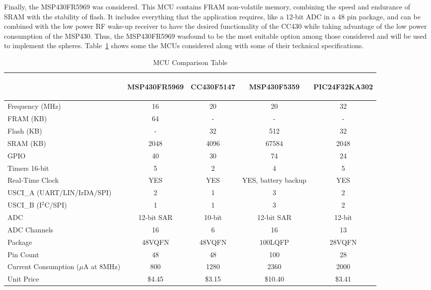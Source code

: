 Finally, the MSP430FR5969 was considered. This MCU contains FRAM non-volatile memory, combining the speed and endurance of SRAM with the stability of flash. It includes everything that the application requires, like a 12-bit ADC in a 48 pin package, and can be combined with the low power RF wake-up receiver to have the desired functionality of the CC430 while taking advantage of the low power consumption of the MSP430. Thus, the MSP430FR5969 wasfound to be the most suitable option among those considered and will be used to implement the spheres. Table~\ref{tab:mcuComp} shows some the MCUs considered along with some of their technical specifications.
\begin{table}[H]
\setlength{\extrarowheight}{1.5pt}
  \centering
  \caption{MCU Comparison Table}
    \begin{tabular}{|m{1.5in}|c|c|c|c|}
    \cline{2-5}
    \multicolumn{1}{c|}{} & \begin{sideways}MSP430FR5969 \end{sideways} &\begin{sideways} CC430F5147 \end{sideways}& \begin{sideways}MSP430F5359 \end{sideways}& \begin{sideways}PIC24F32KA302\end{sideways}\\ 
    \hline
    Frequency (MHz) & 16    & 20    & 20    & 32\\ \hline
    FRAM (KB) & 64    & -     & -     & -\\ \hline
    Flash (KB) & -     & 32    & 512   & 32\\ \hline
    SRAM (KB) & 2048  & 4096  & 67584 & 2048 \\ \hline
    GPIO  & 40    & 30    & 74    & 24    \\ \hline
    Timers 16-bit & 5     & 2     & 4     & 5     \\ \hline
    Real-Time Clock & YES   & YES   & YES, battery backup & YES   \\ \hline
    USCI\_A (UART/LIN/IrDA/SPI) & 2     & 1     & 3     & 2     \\ \hline
    USCI\_B (I$^2$C/SPI) & 1     & 1     & 3     & 2     \\ \hline
    ADC   & 12-bit SAR & 10-bit & 12-bit SAR & 12-bit \\ \hline
    ADC Channels & 16    & 6     & 16    & 13    \\ \hline
    Package & 48VQFN & 48VQFN & 100LQFP & 28VQFN \\ \hline
    Pin Count & 48    & 48    & 100   & 28    \\ \hline
    Current Consumption ($\mu$A at 8MHz) & 800   & 1280  & 2360  & 2000  \\ \hline
    Unit Price & \$4.45  & \$3.15  & \$10.40 & \$3.41  \\ \hline
    \end{tabular}%
  \label{tab:mcuComp}%
\end{table}%
